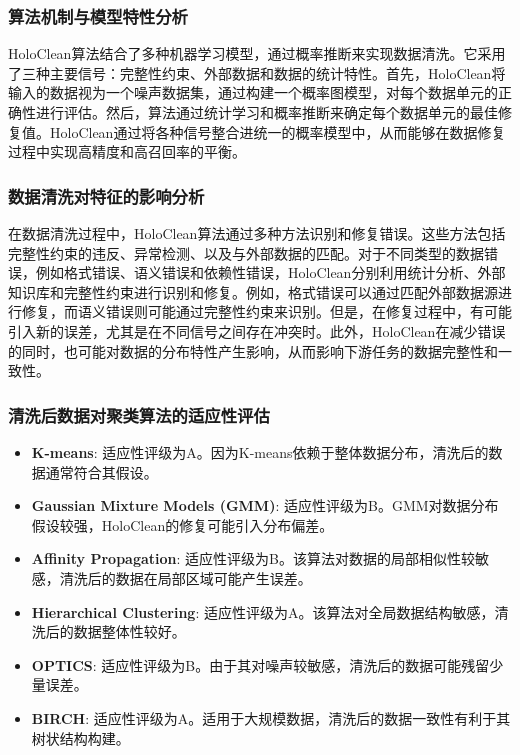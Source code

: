 \documentclass{ctexart} %
\begin{document}
\subsubsection{算法机制与模型特性分析}

HoloClean算法结合了多种机器学习模型，通过概率推断来实现数据清洗。它采用了三种主要信号：完整性约束、外部数据和数据的统计特性。首先，HoloClean将输入的数据视为一个噪声数据集，通过构建一个概率图模型，对每个数据单元的正确性进行评估。然后，算法通过统计学习和概率推断来确定每个数据单元的最佳修复值。HoloClean通过将各种信号整合进统一的概率模型中，从而能够在数据修复过程中实现高精度和高召回率的平衡。

\subsubsection{数据清洗对特征的影响分析}

在数据清洗过程中，HoloClean算法通过多种方法识别和修复错误。这些方法包括完整性约束的违反、异常检测、以及与外部数据的匹配。对于不同类型的数据错误，例如格式错误、语义错误和依赖性错误，HoloClean分别利用统计分析、外部知识库和完整性约束进行识别和修复。例如，格式错误可以通过匹配外部数据源进行修复，而语义错误则可能通过完整性约束来识别。但是，在修复过程中，有可能引入新的误差，尤其是在不同信号之间存在冲突时。此外，HoloClean在减少错误的同时，也可能对数据的分布特性产生影响，从而影响下游任务的数据完整性和一致性。

\subsubsection{清洗后数据对聚类算法的适应性评估}
\begin{itemize}
    \item \textbf{K-means}: 适应性评级为A。因为K-means依赖于整体数据分布，清洗后的数据通常符合其假设。
    \item \textbf{Gaussian Mixture Models (GMM)}: 适应性评级为B。GMM对数据分布假设较强，HoloClean的修复可能引入分布偏差。
    \item \textbf{Affinity Propagation}: 适应性评级为B。该算法对数据的局部相似性较敏感，清洗后的数据在局部区域可能产生误差。
    \item \textbf{Hierarchical Clustering}: 适应性评级为A。该算法对全局数据结构敏感，清洗后的数据整体性较好。
    \item \textbf{OPTICS}: 适应性评级为B。由于其对噪声较敏感，清洗后的数据可能残留少量误差。
    \item \textbf{BIRCH}: 适应性评级为A。适用于大规模数据，清洗后的数据一致性有利于其树状结构构建。
\end{itemize}
\end{document}
